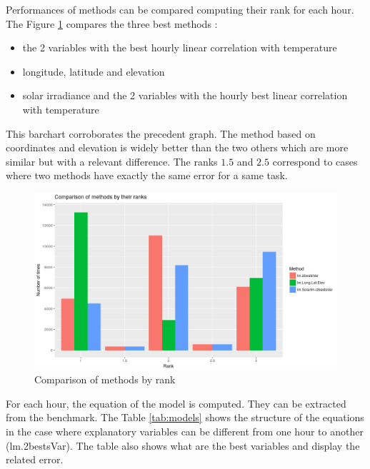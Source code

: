 \documentclass[12pt,twoside]{reedthesis}
\providecommand{\tightlist}{%
  \setlength{\itemsep}{0pt}\setlength{\parskip}{0pt}}
\theoremstyle{definition}
\theoremstyle{definition}
\theoremstyle{definition}
\theoremstyle{remark}
\begin{document}
Performances of methods can be compared computing their rank for each
hour. The Figure \ref{fig:barchart} compares the three best methods :
\begin{itemize}
\tightlist
\item
  the 2 variables with the best hourly linear correlation with
  temperature
\item
  longitude, latitude and elevation
\item
  solar irradiance and the 2 variables with the hourly best linear
  correlation with temperature
\end{itemize}
This barchart corroborates the precedent graph. The method based on
coordinates and elevation is widely better than the two others which are
more similar but with a relevant difference. The ranks \(1.5\) and
\(2.5\) correspond to cases where two methods have exactly the same
error for a same task.
\begin{figure}

{\centering \includegraphics[width=1\linewidth]{figure/barchart} 

}

\caption{Comparison of methods by rank}\label{fig:barchart}
\end{figure}
For each hour, the equation of the model is computed. They can be
extracted from the benchmark. The Table \ref{tab:models} shows the
structure of the equations in the case where explanatory variables can
be different from one hour to another (lm.2bestsVar). The table also
shows what are the best variables and display the related error.
\end{document}
